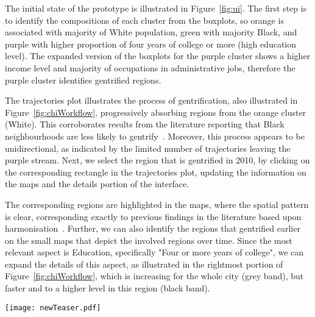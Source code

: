 The initial state of the prototype is illustrated in Figure~\ref{fig:ui}. The
first step is to identify the compositions of each cluster from the boxplots, so
orange is associated with majority of White population, green with majority
Black, and purple with higher proportion of four years of college or more (high
education level). The expanded version of the boxplots for the purple cluster
shows a higher income level and majority of occupations in administrative jobs,
therefore the purple cluster identifies gentrified regions.


The trajectories plot illustrates the process of gentrification, also
illustrated in Figure~\ref{fig:chiWorkflow}, progressively absorbing regions
from the orange cluster (White). This corroborates results from the literature
reporting that Black neighbourhoods are less likely to
gentrify~\citep{Hwang2014}. Moreover, this process appears to be unidirectional,
as indicated by the limited number of trajectories leaving the purple stream.
Next, we select the region that is gentrified in 2010, by clicking on the
corresponding rectangle in the trajectories plot, updating the information on
the maps and the details portion of the interface.

The corresponding regions are highlighted in the maps, where the spatial pattern
is clear, corresponding exactly to previous findings in the literature based
upon harmonisation~\citep{Hwang2014}. Further, we can also identify the regions
that gentrified earlier on the small maps that depict the involved regions over
time. Since the most relevant aspect is Education, specifically "Four or more
years of college", we can expand the details of this aspect, as illustrated in
the rightmost portion of Figure~\ref{fig:chiWorkflow}, which is increasing for
the whole city (grey band), but faster and to a higher level in this region
(black band).



\begin{figure*}
    \centering
 \texttt{[image: newTeaser.pdf]}
 \caption{Workflow to discover gentrification in Chicago: the purple cluster
 corresponds to high education / income. Its population is increasing over time,
 absorbing from the majority White cluster (orange). By selecting the purple
 cluster in 2010, the region is highlighted in the maps. The proportion of
 people with 4+ years of college is increasing in the whole city (grey IQRs),
 but significantly more in this region (black).\label{fig:chiWorkflow}}
\end{figure*}



